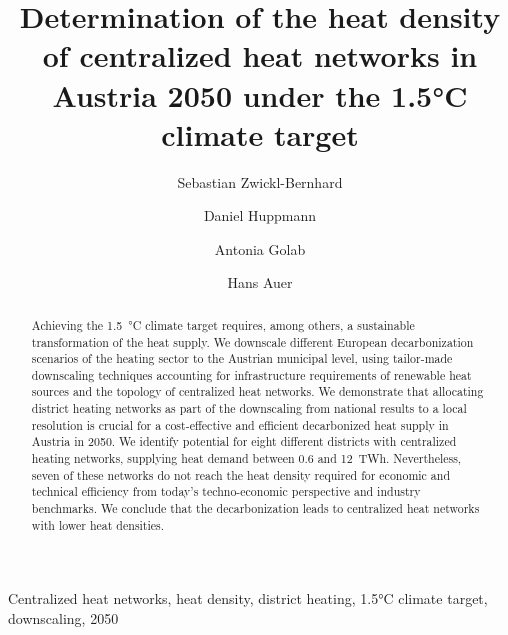 \documentclass[review]{elsarticle}
\begin{document}
\begin{frontmatter}

\title{Determination of the heat density of centralized heat networks in Austria 2050 under the 1.5°C climate target}
\author[1,2]{Sebastian Zwickl-Bernhard}
\author[2]{Daniel Huppmann}
\author[1]{Antonia Golab}
\author[1]{Hans Auer}
\address[1]{Energy Economics Group (EEG), Technische Universität Wien, Gusshausstrasse 25-29/E370-3, 1040 Wien, Austria}
\address[2]{Energy, Climate and Environment (ECE) Program,  International Institute for Applied Systems Analysis (IIASA), Laxenburg, Austria}

\begin{abstract}
	Achieving the \SI{1.5}{\degreeCelsius} climate target requires, among others, a sustainable transformation of the heat supply. We downscale different European decarbonization scenarios of the heating sector to the Austrian municipal level, using tailor-made downscaling techniques accounting for infrastructure requirements of renewable heat sources and the topology of centralized heat networks.
	We demonstrate that allocating district heating networks as part of the downscaling from national results to a local resolution is crucial for a cost-effective and efficient decarbonized heat supply in Austria in 2050. We identify potential for eight different districts with centralized heating networks, supplying heat demand between \SI{0.6}{} and \SI{12}{TWh}. Nevertheless, seven of these networks do not reach the heat density required for economic and technical efficiency from today's techno-economic perspective and industry benchmarks. We conclude that the decarbonization leads to centralized heat networks with lower heat densities.
\end{abstract}

\begin{keyword}
	Centralized heat networks, heat density, district heating, 1.5°C climate target, downscaling, 2050
\end{keyword}
\end{frontmatter}

\newpage
\end{document}
